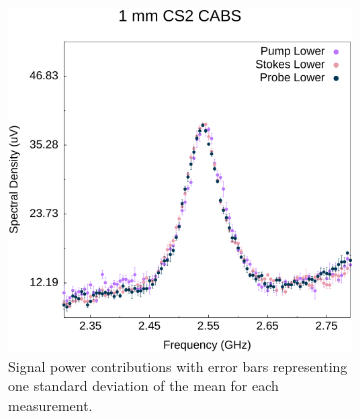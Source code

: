 \documentclass[%
  reprint,
  superscriptaddress,
  amsmath,amssymb,
  aps,
  prapplied,
]{revtex4-2}
\begin{document}
%

\begin{figure}[h]
  \centering
  \begin{subfigure}{0.45\textwidth}
    \centering
    \includegraphics[width=\textwidth]{PSPr-Contribute-Equally.pdf}
    \caption{Signal power contributions with error bars representing one standard deviation of the mean for each measurement.}
    \label{fig:PSPr-Contribute-Equally}
  \end{subfigure}%
  \hfill
  \begin{subfigure}{0.45\textwidth}
    \centering

\end{subfigure}
\end{figure}
\end{document}
